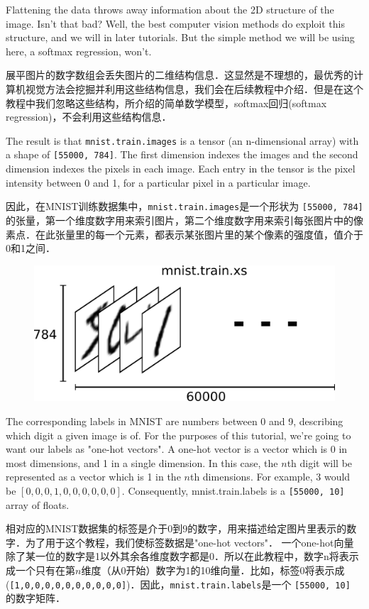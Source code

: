 Flattening the data throws away information about the 2D structure of the image. Isn't that bad? Well, the best computer vision methods do exploit this structure, and we will in later tutorials. But the simple method we will be using here, a softmax regression, won't.

展平图片的数字数组会丢失图片的二维结构信息．这显然是不理想的，最优秀的计算机视觉方法会挖掘并利用这些结构信息，我们会在后续教程中介绍．但是在这个教程中我们忽略这些结构，所介绍的简单数学模型，softmax回归(softmax regression)，不会利用这些结构信息．

The result is that \lstinline{mnist.train.images} is a tensor (an n-dimensional array) with a shape of \lstinline{[55000, 784]}. The first dimension indexes the images and the second dimension indexes the pixels in each image. Each entry in the tensor is the pixel intensity between 0 and 1, for a particular pixel in a particular image.

因此，在MNIST训练数据集中，\lstinline{mnist.train.images}是一个形状为 \lstinline{[55000, 784]} 的张量，第一个维度数字用来索引图片，第二个维度数字用来索引每张图片中的像素点．在此张量里的每一个元素，都表示某张图片里的某个像素的强度值，值介于0和1之间．

\begin{figure}[htbp]
\centering
\includegraphics[width=.7\textwidth]{../SOURCE/images/mnist-train-xs.png}
\caption{}
\end{figure}

The corresponding labels in MNIST are numbers between 0 and 9, describing which digit a given image is of. For the purposes of this tutorial, we're going to want our labels as "one-hot vectors". A one-hot vector is a vector which is 0 in most dimensions, and 1 in a single dimension. In this case, the $n$th digit will be represented as a vector which is 1 in the $n$th dimensions. For example, 3 would be $[0,0,0,1,0,0,0,0,0,0]$. Consequently, mnist.train.labels is a \lstinline{[55000, 10]} array of floats.

相对应的MNIST数据集的标签是介于0到9的数字，用来描述给定图片里表示的数字．为了用于这个教程，我们使标签数据是"one-hot vectors"． 一个one-hot向量除了某一位的数字是1以外其余各维度数字都是0．所以在此教程中，数字n将表示成一个只有在第$n$维度（从0开始）数字为1的10维向量．比如，标签0将表示成(\lstinline{[1,0,0,0,0,0,0,0,0,0,0]})．因此，\lstinline{mnist.train.labels}是一个 \lstinline{[55000, 10]} 的数字矩阵．

